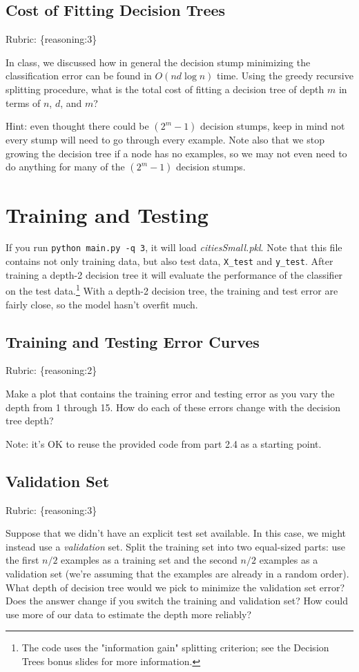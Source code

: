 \documentclass{article}
\def\blu#1{{\color{blu}#1}}
\def\gre#1{{\color{gre}#1}}
\def\rubric#1{\gre{Rubric: \{#1\}}}{}
\begin{document}
\subsection{Cost of Fitting Decision Trees}
\rubric{reasoning:3}

In class, we discussed how in general the decision stump minimizing the classification error can be found in $O(nd\log n)$ time.
Using the greedy recursive splitting procedure, \blu{what is the total cost of fitting a decision tree of depth $m$ in terms of $n$, $d$, and $m$?}

Hint: even thought there could be $(2^m-1)$ decision stumps, keep in mind not every stump will need to go through every example. Note also that we stop growing the decision tree if a node has no examples, so we may not even need to do anything for many of the $(2^m-1)$ decision stumps.


\section{Training and Testing}
If you run \texttt{python main.py \string-q 3}, it will load \emph{citiesSmall.pkl}.
Note that this file contains not only training data, but also test data, \texttt{X\string_test} and \texttt{y\string_test}.
After training a depth-2 decision tree it will evaluate the performance of the classifier on the test data.\footnote{The code uses the "information gain" splitting criterion; see the Decision Trees bonus slides for more information.}
With a depth-2 decision tree, the training and test error are fairly close, so the model hasn't overfit much.

\subsection{Training and Testing Error Curves}
\rubric{reasoning:2}

\blu{Make a plot that contains the training error and testing error as you vary the depth from 1 through 15. How do each of these errors change with the decision tree depth?}

Note: it's OK to reuse the provided code from part 2.4 as a starting point.


\subsection{Validation Set}
\rubric{reasoning:3}

Suppose that we didn't have an explicit test set available. In this case, we might instead use a \emph{validation} set. Split the training set into two equal-sized parts: use the first $n/2$ examples as a training set and the second $n/2$ examples as a validation set (we're assuming that the examples are already in a random order). \blu{What depth of decision tree would we pick to minimize the validation set error? Does the answer change if you switch the training and validation set? How could use more of our data to  estimate the depth more reliably?}
\end{document}
